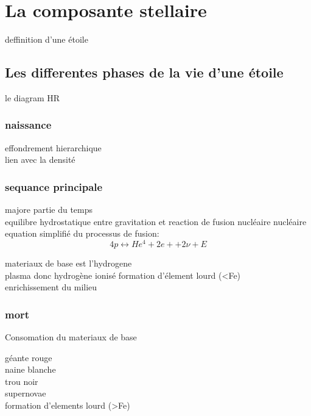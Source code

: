 \chapter{La composante stellaire}

deffinition d'une étoile\\


\section{Les differentes phases de la vie d'une étoile}


le diagram HR



\subsection{naissance}
effondrement hierarchique\\
lien avec la densité\\

\subsection{sequance principale}
majore partie du temps\\

equilibre hydrostatique entre gravitation et reaction de fusion nucléaire nucléaire\\

equation simplifié du processus de fusion:
\begin{equation}
4p \leftrightarrow He^4 + 2e+ + 2\nu + E
\end{equation}




materiaux de base est l'hydrogene\\
plasma donc hydrogène ionisé 
formation d'élement lourd (<Fe)\\
enrichissement du milieu


\subsection{mort}
Consomation du materiaux de base

géante rouge\\
naine blanche\\
trou noir\\
supernovae\\
formation d'elements lourd (>Fe)



